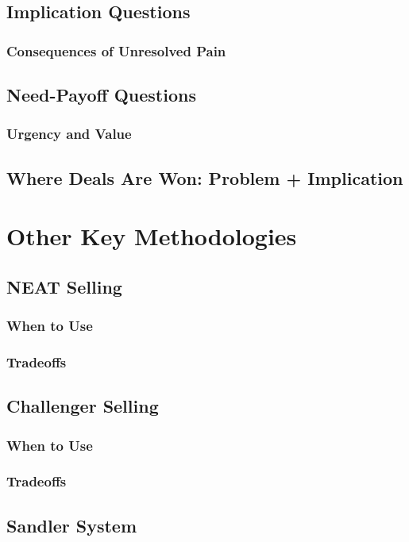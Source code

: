     \subsection{Implication Questions}\mbox{}
        \subsubsection{Consequences of Unresolved Pain}\mbox{}
    \subsection{Need-Payoff Questions}\mbox{}
        \subsubsection{Urgency and Value}\mbox{}
    \subsection{Where Deals Are Won: Problem + Implication}\mbox{}

\section{Other Key Methodologies}\mbox{}
    \subsection{NEAT Selling}\mbox{}
        \subsubsection{When to Use}\mbox{}
        \subsubsection{Tradeoffs}\mbox{}
    \subsection{Challenger Selling}\mbox{}
        \subsubsection{When to Use}\mbox{}
        \subsubsection{Tradeoffs}\mbox{}
    \subsection{Sandler System}\mbox{}

